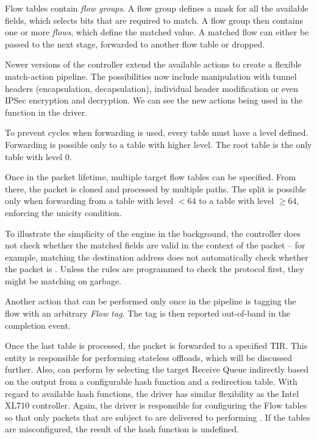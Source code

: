 Flow tables contain \emph{flow groups}. A flow group defines a mask for all the
available fields, which selects bits that are required to match. A flow group
then contains one or more \emph{flows}, which define the matched value.
A matched flow can either be passed to the next stage, forwarded to another flow
table or dropped.

Newer versions of the controller extend the available actions to create
a flexible match-action pipeline. The possibilities now include manipulation
with tunnel headers (encapsulation, decapsulation), individual header
modification or even IPSec encryption and decryption. We can see the new actions being used in the
 function
in the  driver.

To prevent cycles when forwarding is used, every table must have a level
defined. Forwarding is possible only to a table with higher level. The root
table is the only table with level 0.

Once in the packet lifetime, multiple target flow tables can be specified. From
there, the packet is cloned and processed by multiple paths. The split is
possible only when forwarding from a table with level $< 64$ to a table with
level $\ge 64$, enforcing the unicity condition.

To illustrate the simplicity of the engine in the background, the controller
does not check whether the matched fields are valid in the context of the packet
-- for example, matching the destination  address does not automatically
check whether the packet is . Unless the rules are programmed to check
the protocol first, they might be matching on garbage.

Another action that can be performed only once in the pipeline is tagging the
flow with an arbitrary \emph{Flow tag}. The tag is then reported out-of-band in
the completion event.

Once the last table is processed, the packet is forwarded to a specified
\acrfull{TIR}. This entity is responsible for performing stateless offloads,
which will be discussed further. Also,  can perform  by selecting
the target Receive Queue indirectly based on the output from a configurable hash
function and a redirection table. With regard to available hash functions, the
driver has similar flexibility as the Intel XL710 controller.
Again, the driver is responsible for configuring the Flow tables so that only
packets that are subject to  are delivered to  performing
. If the tables are misconfigured, the result of the hash function is
undefined.


